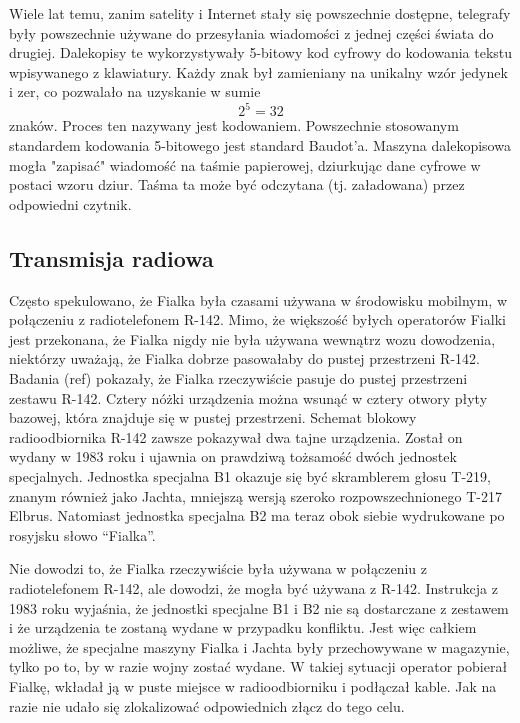 \documentclass{article}
\begin{document}
Wiele lat temu, zanim satelity i Internet stały się powszechnie dostępne, telegrafy były powszechnie używane do przesyłania wiadomości z jednej części świata do drugiej. Dalekopisy te wykorzystywały 5-bitowy kod cyfrowy do kodowania tekstu wpisywanego z klawiatury. Każdy znak był zamieniany na unikalny wzór jedynek i zer, co pozwalało na uzyskanie w sumie 
\begin{equation} \label{eqn}
{2^5 = 32} 
\end{equation}
znaków. Proces ten nazywany jest kodowaniem. Powszechnie stosowanym standardem kodowania 5-bitowego jest standard Baudot’a. Maszyna dalekopisowa mogła "zapisać" wiadomość na taśmie papierowej, dziurkując dane cyfrowe w postaci wzoru dziur. Taśma ta może być odczytana (tj. załadowana) przez odpowiedni czytnik. 

\subsection{Transmisja radiowa}

Często spekulowano, że Fialka była czasami używana w środowisku mobilnym, w połączeniu z radiotelefonem R-142. Mimo, że większość byłych operatorów Fialki jest przekonana, że Fialka nigdy nie była używana wewnątrz wozu dowodzenia, niektórzy uważają, że Fialka dobrze pasowałaby do pustej przestrzeni R-142. Badania (ref) pokazały, że Fialka rzeczywiście pasuje do pustej przestrzeni zestawu R-142. Cztery nóżki urządzenia można wsunąć w cztery otwory płyty bazowej, która znajduje się w pustej przestrzeni. Schemat blokowy radioodbiornika R-142 zawsze pokazywał dwa tajne urządzenia. Został on wydany w 1983 roku i ujawnia on prawdziwą tożsamość dwóch jednostek specjalnych. Jednostka specjalna B1 okazuje się być skramblerem głosu T-219, znanym również jako Jachta, mniejszą wersją szeroko rozpowszechnionego T-217 Elbrus. Natomiast jednostka specjalna B2 ma teraz obok siebie wydrukowane po rosyjsku słowo “Fialka”.

Nie dowodzi to, że Fialka rzeczywiście była używana w połączeniu z radiotelefonem R-142, ale dowodzi, że mogła być używana z R-142. Instrukcja z 1983 roku wyjaśnia, że jednostki specjalne B1 i B2 nie są dostarczane z zestawem i że urządzenia te zostaną wydane w przypadku konfliktu. Jest więc całkiem możliwe, że specjalne maszyny Fialka i Jachta były przechowywane w magazynie, tylko po to, by w razie wojny zostać wydane. W takiej sytuacji operator pobierał Fialkę, wkładał ją w puste miejsce w radioodbiorniku i podłączał kable. Jak na razie nie udało się zlokalizować odpowiednich złącz do tego celu.
\end{document}
